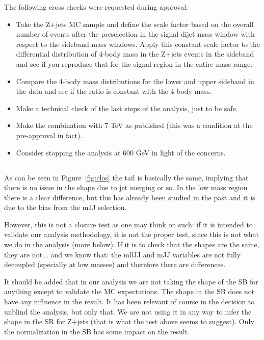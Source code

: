 The following cross checks were requested during approval:
\begin{itemize}
\item Take the Z+jets MC sample and define the scale factor based on the
overall number of events after the preselection in the signal dijet mass
window with respect to the sideband mass windows. Apply this constant scale
factor to the differential distribution of 4-body mass in the Z+jets events
in the sideband and see if you reproduce that for the signal region in the
entire mass range.

\item Compare the 4-body mass distributions for the lower and upper sideband in
the data and see if the ratio is constant with the 4-body mass.

\item Make a technical check of the last steps of the analysis, just to be safe.

\item Make the combination with 7 TeV as published (this was a condition at the pre-approval in fact).

\item Consider stopping the analysis at 600 GeV in light of the concerns.

\end{itemize}

\subsection{}

As can be seen in Figure~\ref{fig:clos} the tail is basically the same, implying that there is no issue
in the shape due to jet merging or so. In the low mass region there is a clear
difference, but this has already been studied in the past and it is due to the
bias from the mJJ selection.

However, this is not a closure test as one may think on such: if it is intended to
validate our analysis methodology, it is not the proper test, since this is not
what we do in the analysis (more below). If it is to check that the shapes are
the same, they are not... and we know that: the mllJJ and mJJ variables are not
fully decoupled (specially at low masses) and therefore there are differences.

It should be added that in our analysis we are not taking the shape of the SB
for anything except to validate the MC expectations. The shape in the SB does
not have any influence in the result. It has been relevant of course in the
decision to unblind the analysis, but only that. We are not using it in any way
to infer the shape in the SR for Z+jets (that is what the test above seems to
suggest).
Only the normalization in the SB has some impact on the result.

